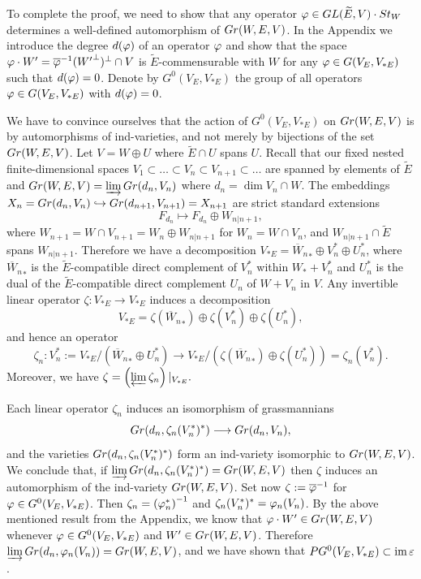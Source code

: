 \documentclass[11pt, a4paper]{article}
\begin{document}
To complete the proof, we need to show that any operator $\varphi \in GL(\widetilde{E},V)\cdot St_W$ determines a well-defined automorphism of $Gr(W,E,V)$. In the Appendix we introduce the degree $d(\varphi)$ of an operator $\varphi$ and show that the space $\varphi \cdot W'=\overline{\varphi}^{-1}({W'}^{\perp})^{\perp}\cap V$ is $\widetilde{E}$-commensurable with $W$ for any $\varphi \in  G(V_E,V_{*E})$ such that $d(\varphi)=0$. Denote by $G^0(V_E,V_{*E})$ the group of all operators $\varphi\in G(V_E,V_{*E})$ with $d(\varphi)=0$.

We have to convince ourselves that the action of $G^0(V_E,V_{*E})$
on $Gr(W,E,V)$ is by automorphisms of ind-varieties, and not merely by bijections of the set $Gr(W,E,V)$. Let $V=W\oplus U$ where $\widetilde{E}\cap U$ spans $U$. Recall that our fixed nested finite-dimensional spaces $V_1 \subset \ldots \subset V_n \subset V_{n+1}\subset \ldots$ are spanned by elements of $\widetilde{E}$ and $Gr(W,E,V)=\varinjlim Gr(d_n,V_n)$ where $d_n=\dim V_n\cap W$. The embeddings $X_n=Gr(d_n,V_n)\hookrightarrow Gr(d_{n+1},V_{n+1})=X_{n+1}$ are strict standard extensions \begin{equation*}
    F_{d_n}\longmapsto F_{d_n}\oplus W_{n|n+1},
\end{equation*}
where $W_{n+1}=W\cap V_{n+1}=W_n\oplus W_{n|n+1}$ for $W_n=W\cap V_n$, and $W_{n|n+1}\cap \widetilde{E}$ spans $W_{n|n+1}$. Therefore we have a decomposition $V_{*E}={\overline{W}_{n}}_* \oplus V^*_n \oplus U^*_n$, where ${\overline{W}_{n}}_*$ is the $\widetilde{E}$-compatible direct complement of $V^*_n$ within $W_*+ V^*_n$ and $U^*_n$ is the dual of the $\widetilde{E}$-compatible direct complement $U_n$ of $W+V_n$ in $V$. Any invertible linear operator $\zeta\colon V_{*E}\rightarrow V_{*E}$ induces a decomposition\begin{equation*}
    V_{*E}=\zeta({\overline{W}_{n}}_*)\oplus \zeta(V^*_n)\oplus \zeta(U^*_n),
\end{equation*} 
and hence an operator\begin{equation*}
    \zeta_n\colon V^*_n:=V_{*E}/({\overline{W}_{n}}_*\oplus U^*_n)\longrightarrow V_{*E}/(\zeta({\overline{W}_{n}}_*)\oplus \zeta(U^*_n))=\zeta_n(V^*_n).
\end{equation*}
Moreover, we have $\zeta=\left(\varprojlim\zeta_n\right)|_{V_{*E}}.$

Each linear operator $\zeta_n$ induces an isomorphism of grassmannians \begin{equation*}
    Gr(d_n,\zeta_n(V^*_n)^*)\longrightarrow Gr(d_n,V_n),
\end{equation*}
and the varieties $Gr(d_n,\zeta_n(V^*_n)^*)$ form an ind-variety isomorphic to $Gr(W,E,V)$. We conclude that, if $\varinjlim Gr(d_n,\zeta_n(V^*_n)^*)=Gr(W,E,V)$ then $\zeta$ induces an automorphism of the ind-variety $Gr(W,E,V)$. Set now $\zeta:=\overline{\varphi}^{-1}$ for $\varphi\in G^0(V_E,V_{*E})$. Then $\zeta_n=\left(\varphi^*_n\right)^{-1}$ and $\zeta_n(V^*_n)^*=\varphi_n(V_n)$.  By the above mentioned result from the Appendix, we know that  $\varphi \cdot W'\in Gr(W,E,V)$ whenever $\varphi \in G^0(V_E,V_{*E})$ and $W'\in Gr(W,E,V)$.
Therefore $\varinjlim Gr(d_n,\varphi_n(V_n))=Gr(W,E,V)$,
and we have shown that $P G^0(V_E,V_{*E})\subset \mathrm{im}\,\varepsilon$. 
\end{document}
